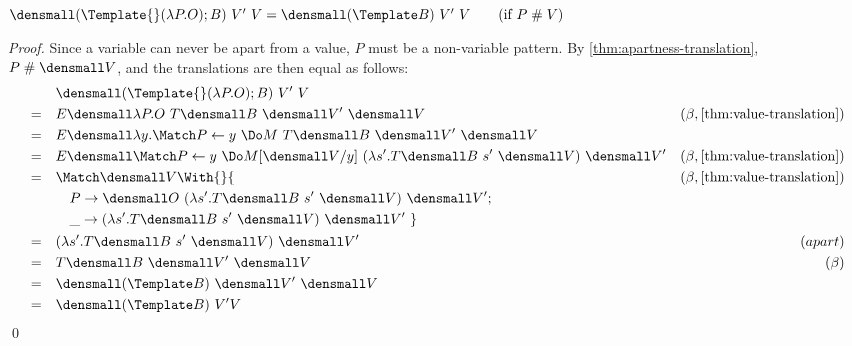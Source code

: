\begin{lemma}
  \label{thm:template-do-apart}
  \\
  $\den{(\Template{} (\lambda P. O); B) ~ V' ~ V} = \den{(\Template B) ~ V' ~ V}
  \qquad (\text{if } P \apart V)$
\end{lemma}
\begin{proof}
  Since a variable can never be apart from a value, $P$ must be a non-variable pattern.
  By \cref{thm:apartness-translation}, $P \apart \den{V}$, and the translations are then equal as follows:
  \begin{align*}
    & \quad \den{(\Template{} (\lambda P. O); B) ~ V' ~ V} \\
    =& \quad E\den{\lambda P. O} ~T\den{B} ~\den{V'} ~\den{V} & (\beta,\cref{thm:value-translation}) \\
    =&\quad E\den{\lambda y. \Match P \gets y ~\Do M} ~T\den{B} ~\den{V'} ~\den{V} \\
    =&\quad E\den{\Match P \gets y ~\Do M}\subst{y}{\den{V}} ~(\lambda s'. T\den{B} ~s' ~\den{V}) ~\den{V'} & (\beta, \cref{thm:value-translation}) \\
    =& \quad
    \begin{aligned}[t]
      &\Match \den{V} \With{} \{ \\
      &\quad P \to \den{O}~(\lambda s'. T\den{B} ~s' ~\den{V})~\den{V'}; \\
      &\quad \_ \to (\lambda s'. T\den{B} ~s' ~\den{V})~\den{V'}
      ~\}
    \end{aligned}
    & (\beta, \cref{thm:value-translation}) \\
    =& \quad (\lambda s'. T\den{B} ~s' ~\den{V}) ~\den{V'} & (apart)\\
    =& \quad T\den{B} ~ \den{V'} ~ \den{V} & (\beta) \\
    =& \quad \den{(\Template B)} ~ \den{V'} ~ \den{V} \\
    =& \quad \den{(\Template B) ~ V' V}
  \end{align*}
  \qed
\end{proof}

